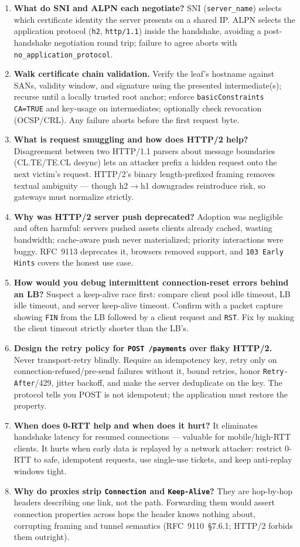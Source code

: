 \begin{enumerate}[label=\textbf{Q\arabic*.}, leftmargin=2.8em, start=27]
  \item \textbf{What do SNI and ALPN each negotiate?} SNI (\texttt{server\_name}) selects which certificate identity the server presents on a shared IP. ALPN selects the application protocol (\texttt{h2}, \texttt{http/1.1}) inside the handshake, avoiding a post-handshake negotiation round trip; failure to agree aborts with \texttt{no\_application\_protocol}.
  \item \textbf{Walk certificate chain validation.} Verify the leaf's hostname against SANs, validity window, and signature using the presented intermediate(s); recurse until a locally trusted root anchor; enforce \texttt{basicConstraints CA=TRUE} and key-usage on intermediates; optionally check revocation (OCSP/CRL). Any failure aborts before the first request byte.
  \item \textbf{What is request smuggling and how does HTTP/2 help?} Disagreement between two HTTP/1.1 parsers about message boundaries (CL.TE/TE.CL desync) lets an attacker prefix a hidden request onto the next victim's request. HTTP/2's binary length-prefixed framing removes textual ambiguity --- though h2$\to$h1 downgrades reintroduce risk, so gateways must normalize strictly.
  \item \textbf{Why was HTTP/2 server push deprecated?} Adoption was negligible and often harmful: servers pushed assets clients already cached, wasting bandwidth; cache-aware push never materialized; priority interactions were buggy. RFC~9113 deprecates it, browsers removed support, and \texttt{103 Early Hints} covers the honest use case.
  \item \textbf{How would you debug intermittent connection-reset errors behind an LB?} Suspect a keep-alive race first: compare client pool idle timeout, LB idle timeout, and server keep-alive timeout. Confirm with a packet capture showing \texttt{FIN} from the LB followed by a client request and \texttt{RST}. Fix by making the client timeout strictly shorter than the LB's.
  \item \textbf{Design the retry policy for \texttt{POST /payments} over flaky HTTP/2.} Never transport-retry blindly. Require an idempotency key, retry only on connection-refused/pre-send failures without it, bound retries, honor \texttt{Retry-After}/429, jitter backoff, and make the server deduplicate on the key. The protocol tells you POST is not idempotent; the application must restore the property.
  \item \textbf{When does 0-RTT help and when does it hurt?} It eliminates handshake latency for resumed connections --- valuable for mobile/high-RTT clients. It hurts when early data is replayed by a network attacker: restrict 0-RTT to safe, idempotent requests, use single-use tickets, and keep anti-replay windows tight.
  \item \textbf{Why do proxies strip \texttt{Connection} and \texttt{Keep-Alive}?} They are hop-by-hop headers describing one link, not the path. Forwarding them would assert connection properties across hops the header knows nothing about, corrupting framing and tunnel semantics (RFC~9110~\S7.6.1; HTTP/2 forbids them outright).
\end{enumerate}

